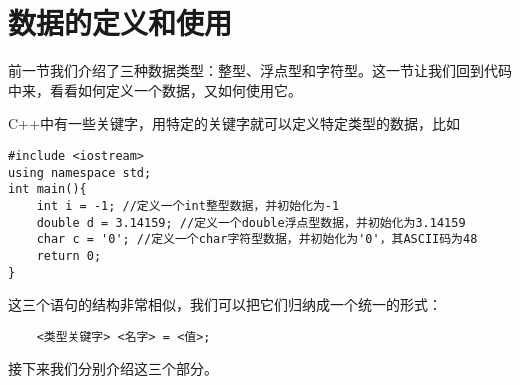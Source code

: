 \section{数据的定义和使用}
前一节我们介绍了三种数据类型：整型、浮点型和字符型。这一节让我们回到代码中来，看看如何定义一个数据，又如何使用它。\par
C++中有一些关键字，用特定的关键字就可以定义特定类型的数据，比如
\begin{lstlisting}
#include <iostream>
using namespace std;
int main(){
    int i = -1; //定义一个int整型数据，并初始化为-1
    double d = 3.14159; //定义一个double浮点型数据，并初始化为3.14159
    char c = '0'; //定义一个char字符型数据，并初始化为'0'，其ASCII码为48
    return 0;
}
\end{lstlisting}
这三个语句的结构非常相似，我们可以把它们归纳成一个统一的形式：
\begin{lstlisting}
    <类型关键字> <名字> = <值>;
\end{lstlisting}
接下来我们分别介绍这三个部分。\par
